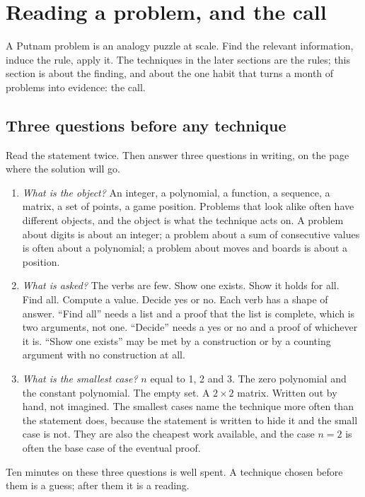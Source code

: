 \section{Reading a problem, and the call}
\label{sec:reading}

A Putnam problem is an analogy puzzle at scale. Find the relevant information, induce the rule, apply it. The techniques in the later sections are the rules; this section is about the finding, and about the one habit that turns a month of problems into evidence: the call.

\subsection*{Three questions before any technique}

Read the statement twice. Then answer three questions in writing, on the page where the solution will go.

\begin{enumerate}[nosep,leftmargin=*]
\item \emph{What is the object?} An integer, a polynomial, a function, a sequence, a matrix, a set of points, a game position. Problems that look alike often have different objects, and the object is what the technique acts on. A problem about digits is about an integer; a problem about a sum of consecutive values is often about a polynomial; a problem about moves and boards is about a position.
\item \emph{What is asked?} The verbs are few. Show one exists. Show it holds for all. Find all. Compute a value. Decide yes or no. Each verb has a shape of answer. ``Find all'' needs a list and a proof that the list is complete, which is two arguments, not one. ``Decide'' needs a yes or no and a proof of whichever it is. ``Show one exists'' may be met by a construction or by a counting argument with no construction at all.
\item \emph{What is the smallest case?} $n$ equal to 1, 2 and 3. The zero polynomial and the constant polynomial. The empty set. A $2 \times 2$ matrix. Written out by hand, not imagined. The smallest cases name the technique more often than the statement does, because the statement is written to hide it and the small case is not. They are also the cheapest work available, and the case $n = 2$ is often the base case of the eventual proof.
\end{enumerate}

Ten minutes on these three questions is well spent. A technique chosen before them is a guess; after them it is a reading.

